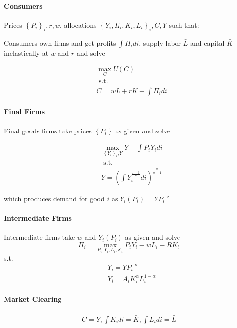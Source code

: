 \documentclass[10pt]{article}
\begin{document}
\paragraph{Consumers}


Prices $\left\{P_i\right\}_i, r, w$, allocations $\left\{Y_i, \Pi_i, K_i, L_i\right\}_i, C, Y$ such that:

Consumers own firms and get profits $\int \Pi_i d i$, supply labor $\bar{L}$ and capital $\bar{K}$ inelastically at $w$ and $r$ and solve

\begin{align}
    &\max _C U(C) \\
    &\text { s.t. } \\
    &C=w \bar{L}+r \bar{K}+\int \Pi_i d i
\end{align}

\paragraph{Final Firms}

Final goods firms take prices $\left\{P_i\right\}$ as given and solve

\begin{align}
    &\max _{\left\{Y_i\right\}_i, Y} Y-\int P_i Y_i d i \\
    &\text { s.t. } \\
    &Y=\left(\int Y_i^{\frac{\sigma-1}{\sigma}} d i\right)^{\frac{\sigma}{\sigma-1}}
\end{align}

which produces demand for good $i$ as $Y_i\left(P_i\right)=Y P_i^{-\sigma}$

\paragraph{Intermediate Firms}

Intermediate firms take $w$ and $Y_i\left(P_i\right)$ as given and solve
$$
\Pi_i=\max _{P_i, Y_i, L_i, K_i} P_i Y_i-w L_i-R K_i
$$
s.t.
$$
\begin{aligned}
& Y_i=Y P_i^{-\sigma} \\
& Y_i=A_i K_i^\alpha L_i^{1-\alpha}
\end{aligned}
$$

\paragraph{Market Clearing}

\begin{align}
    C=Y, \int K_i d i=\bar{K}, \int L_i d i=\bar{L}
\end{align}
\end{document}
